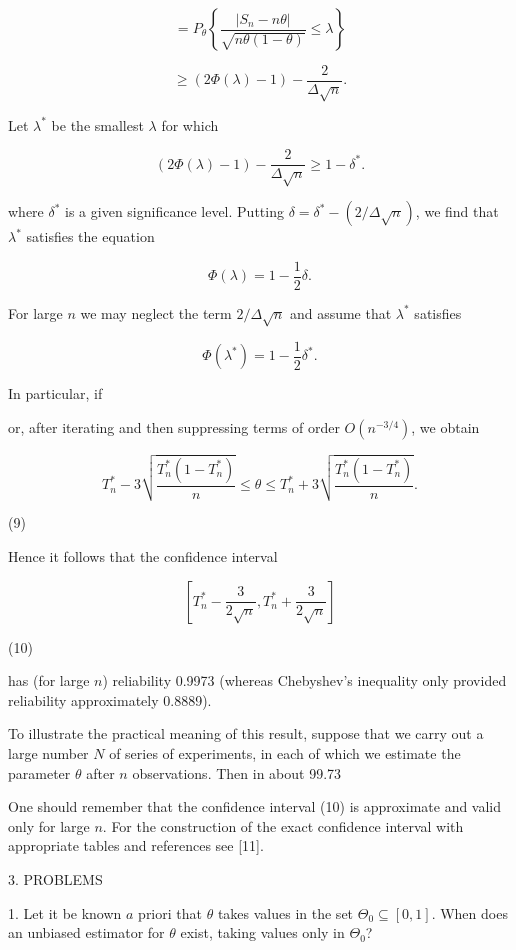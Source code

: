 $$= P_\theta \left\{ \frac{|S_n - n\theta|}{\sqrt{n\theta(1-\theta)}} \leq \lambda \right\}$$

$$\geq (2\Phi(\lambda) - 1) - \frac{2}{\Delta\sqrt{n}}.$$

Let $\lambda^*$ be the smallest $\lambda$ for which

$$(2\Phi(\lambda) - 1) - \frac{2}{\Delta\sqrt{n}} \geq 1 - \delta^*.$$

where $\delta^*$ is a given significance level. Putting $\delta = \delta^* - (2/\Delta\sqrt{n})$, we find that $\lambda^*$ satisfies the equation

$$\Phi(\lambda) = 1 - \frac{1}{2}\delta.$$

For large $n$ we may neglect the term $2/\Delta\sqrt{n}$ and assume that $\lambda^*$ satisfies

$$\Phi(\lambda^*) = 1 - \frac{1}{2}\delta^*.$$

In particular, if

or, after iterating and then suppressing terms of order $O(n^{-3/4})$, we obtain

$$T_n^* - 3\sqrt{\frac{T_n^*(1 - T_n^*)}{n}} \leq \theta \leq T_n^* + 3\sqrt{\frac{T_n^*(1 - T_n^*)}{n}}.$$  

(9)

Hence it follows that the confidence interval

$$\left[ T_n^* - \frac{3}{2\sqrt{n}}, T_n^* + \frac{3}{2\sqrt{n}} \right]$$  

(10)

has (for large $n$) reliability 0.9973 (whereas Chebyshev’s inequality only provided reliability approximately 0.8889).

To illustrate the practical meaning of this result, suppose that we carry out a large number $N$ of series of experiments, in each of which we estimate the parameter $\theta$ after $n$ observations. Then in about 99.73%

One should remember that the confidence interval (10) is approximate and valid only for large $n$. For the construction of the exact confidence interval with appropriate tables and references see [11].

3. PROBLEMS

1. Let it be known $a$ priori that $\theta$ takes values in the set $\Theta_0 \subseteq [0, 1]$. When does an unbiased estimator for $\theta$ exist, taking values only in $\Theta_0$?


